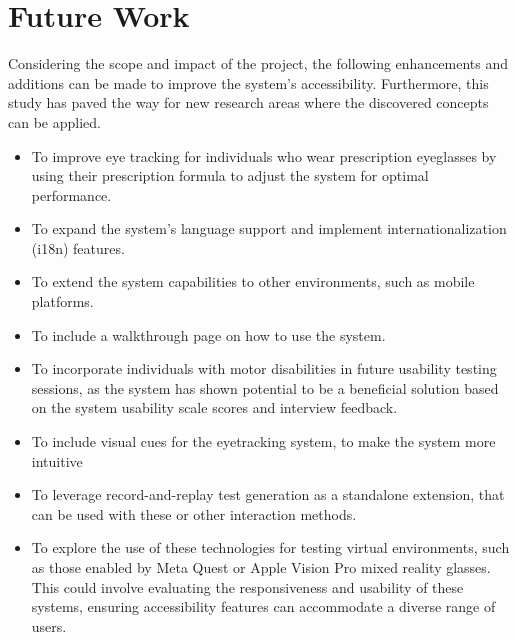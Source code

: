 \section{Future Work}

Considering the scope and impact of the project, the following enhancements and additions can be made to improve the system's accessibility. Furthermore, this study has paved the way for new research areas where the discovered concepts can be applied.

\begin{itemize}
    \item To improve eye tracking for individuals who wear prescription eyeglasses by using their prescription formula to adjust the system for optimal performance.
    \item To expand the system's language support and implement internationalization (i18n) features.
    \item To extend the system capabilities to other environments, such as mobile platforms.
    \item To include a walkthrough page on how to use the system.
    \item To incorporate individuals with motor disabilities in future usability testing sessions, as the system has shown potential to be a beneficial solution based on the system usability scale scores and interview feedback.
    \item To include visual cues for the eyetracking system, to make the system more intuitive
    \item To leverage record-and-replay test generation as a standalone extension, that can be used with these or other interaction methods.
    \item To explore the use of these technologies for testing virtual environments, such as those enabled by Meta Quest or Apple Vision Pro mixed reality glasses. This could involve evaluating the responsiveness and usability of these systems, ensuring accessibility features can accommodate a diverse range of users. 
\end{itemize}
